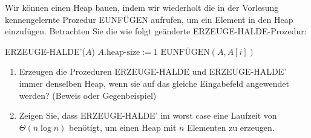 
\begin{exercise}

Wir können einen Heap bauen, indem wir wiederholt die in der Vorlesung kennengelernte Prozedur EUNFÜGEN aufrufen, um ein Element in den Heap einzufügen.
Betrachten Sie die wie folgt geänderte ERZEUGE-HALDE-Prozedur: \\

\begin{algorithmic}
    \State ERZEUGE-HALDE'($A$)
    \State $A.\text{heap-size}:= 1$
        \State $\text{EUNFÜGEN}(A, A[i])$
    \EndFor
\end{algorithmic}

\begin{enumerate}[label = \alph*]

    \item Erzeugen die Prozeduren ERZEUGE-HALDE und ERZEUGE-HALDE' immer denselben Heap, wenn sie auf das gleiche Eingabefeld angewendet werden?
    (Beweis oder Gegenbeispiel)

    \item Zeigen Sie, dass ERZEUGE-HALDE' im worst case eine Laufzeit von $\Theta(n \log n)$ benötigt, um einen Heap mit $n$ Elementen zu erzeugen.

\end{enumerate}

\end{exercise}


